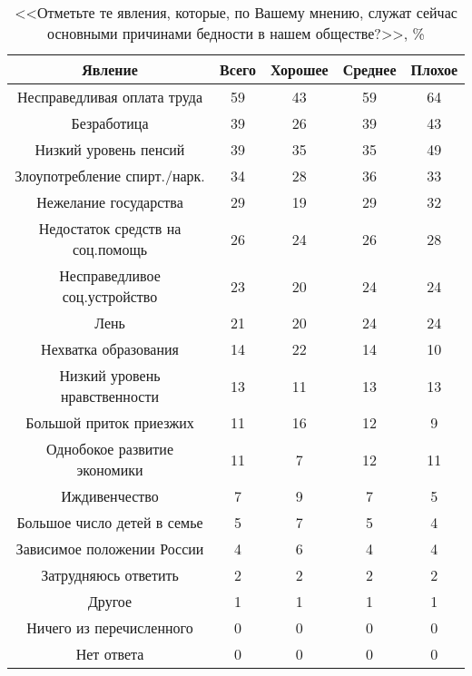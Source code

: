 \begin{table}[h!]
    \centering
    \begin{tabular}{|c|c|c|c|c|}
        \hline
        Явление & Всего & Хорошее & Среднее & Плохое \\ \hline \hline
        Несправедливая оплата труда & 59 & 43 & 59 & 64 \\ \hline
        Безработица & 39 & 26 & 39 & 43 \\ \hline
        Низкий уровень пенсий & 39 & 35 & 35 & 49 \\ \hline
        Злоупотребление спирт./нарк. & 34 & 28 & 36 & 33 \\ \hline
        Нежелание государства & 29 & 19 & 29 & 32 \\ \hline
        Недостаток средств на соц.помощь & 26 & 24 & 26 & 28 \\ \hline
        Несправедливое соц.устройство & 23 & 20 & 24 & 24 \\ \hline
        Лень & 21 & 20 & 24 & 24 \\ \hline
        Нехватка образования & 14 & 22 & 14 & 10 \\ \hline
        Низкий уровень нравственности & 13 & 11 & 13 & 13 \\ \hline
        Большой приток приезжих & 11 & 16 & 12 & 9 \\ \hline
        Однобокое развитие экономики & 11 & 7 & 12 & 11 \\ \hline
        Иждивенчество & 7 & 9 & 7 & 5 \\ \hline
        Большое число детей в семье & 5 & 7 & 5 & 4 \\ \hline
        Зависимое положении России & 4 & 6 & 4 & 4 \\ \hline
        Затрудняюсь ответить & 2 & 2 & 2 & 2 \\ \hline
        Другое & 1 & 1 & 1 & 1 \\ \hline
        Ничего из перечисленного & 0 & 0 & 0 & 0 \\ \hline
        Нет ответа & 0 & 0 & 0 & 0\\ \hline
    \end{tabular}
    \caption{<<Отметьте те явления, которые, по Вашему мнению, служат сейчас 
        основными причинами бедности в нашем обществе?>>, \%}
\end{table}

